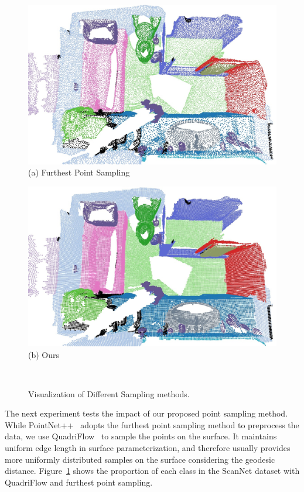 \begin{figure}[h]
    \centering
    \begin{minipage}{0.4\linewidth}
    \centering
    \includegraphics[width=\linewidth]{texturenet/sampling/sampling_fps00.jpg}
    (a) Furthest Point Sampling
    \end{minipage}
    \begin{minipage}{0.4\linewidth}
    \centering
    \includegraphics[width=\linewidth]{texturenet/sampling/sampling_ours00.jpg}
    (b) Ours
    \end{minipage}\\
    \vspace{0.1cm}
    \caption{Visualization of Different Sampling methods.}
    \label{fig:texturenet-sampling}
\end{figure}

The next experiment tests the impact of our proposed point sampling method.  While PointNet++~\cite{qi2017pointnet++} adopts the furthest point sampling method to preprocess the data, we use QuadriFlow~\cite{huang2018quadriflow} to sample the points on the surface. It maintains uniform edge length in surface parameterization, and therefore usually provides more uniformly distributed samples on the surface considering the geodesic distance. Figure~\ref{fig:texturenet-sampling} shows the proportion of each class in the ScanNet dataset with QuadriFlow and furthest point sampling.

